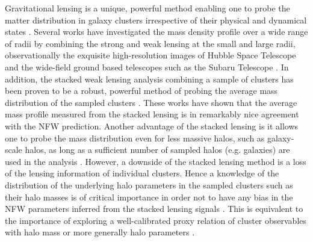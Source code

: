 \documentclass[iop, apj]{emulateapj}
\newcommand{\mt}[1]{{\textcolor{blue}{#1}}}
\newcommand{\?}{\stackrel{?}{=}}
\begin{document}
Gravitational lensing is a unique, powerful method enabling one to probe
the matter distribution in galaxy clusters irrespective of their
physical and dynamical states \citep{Schneider:06}. Several works have
investigated the mass density profile over a wide range of radii by
combining the strong and weak lensing at the small and large radii,
observationally the exquisite high-resolution images of Hubble Space
Telescope and the wide-field ground based telescopes such as the Subaru
Telescope
\citep{TysonFischer:95,Kneibetal:03,Broadhurstetal:05,Smithetal:05,Ogurietal:05,Ogurietal:12,Newmanetal:13,Zitrinetal:14,Mertenetal:14}.
In addition, the stacked weak lensing analysis combining a sample of
clusters has been proven to be a robust, powerful method of probing the
average mass distribution of the sampled clusters
\citep{Johnstonetal:07,Okabeetal:10,Ogurietal:12,Okabeetal:13,Umetsuetal:14}.
These works have shown that the average mass profile measured from the
stacked lensing is in remarkably nice agreement with the NFW prediction.
Another advantage of the stacked lensing is it allows one to probe the
mass distribution even for less massive halos, such as galaxy-scale
halos, as long as a sufficient number of sampled halos (e.g. galaxies)
are used in the analysis
\citep{Mandelbaumetal:05,Leauthaudetal:10,Miyatakeetal:13}. However, a
downside of the stacked lensing method is a loss of the lensing
information of individual clusters. Hence a knowledge of the
distribution of the underlying halo parameters in the sampled clusters
such as their halo masses is of critical importance in order not to have
any bias in the NFW parameters inferred from the stacked lensing signals
\citep{OguriTakada:11}. This is equivalent to the importance of
exploring a well-calibrated proxy relation of cluster observables
 with halo mass or more generally halo parameters 
\citep{Rozoetal:09,Zhangetal:10,Okabeetal:10b,Zhangetal:11,Mahdavietal:13,vanderLindenetal:14,Martinoetal:14,Okabeetal:14}.
\end{document}

